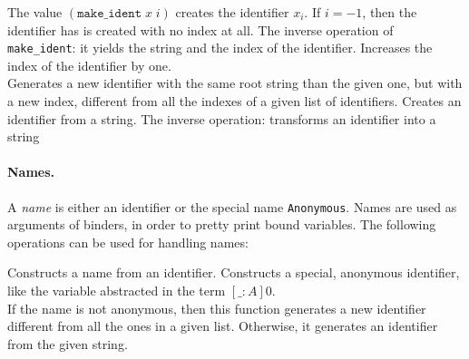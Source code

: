 \begin{description}
    {The value $(\texttt{make\_ident}\;x\;i)$ creates the
    identifier $x_i$. If $i=-1$, then the identifier has
    is created with no index at all.}
    {The inverse operation of \texttt{make\_ident}: 
     it yields the string and the index of the identifier.}
    {Increases the index of the identifier by one.}
    {\\ Generates a new identifier with the same root string than the
    given one, but with a new index, different from all the indexes of
    a given list of identifiers.} 
    {Creates an identifier from a string.}  
    {The inverse operation: transforms an identifier into a string}
\end{description}

\paragraph{Names.} A \textsl{name} is either an identifier or the 
special name \texttt{Anonymous}. Names are used as arguments of
binders, in order to pretty print bound variables.
The following operations can be used for handling names:

\begin{description}
    {Constructs a name from  an identifier.}
    {Constructs a special, anonymous identifier, like the variable abstracted 
     in the term $[\_:A]0$.}
{\\ If the name is not anonymous, then this function generates a new
    identifier different from all the ones in a given list. Otherwise, it
    generates an identifier from the given string.}
\end{description}

